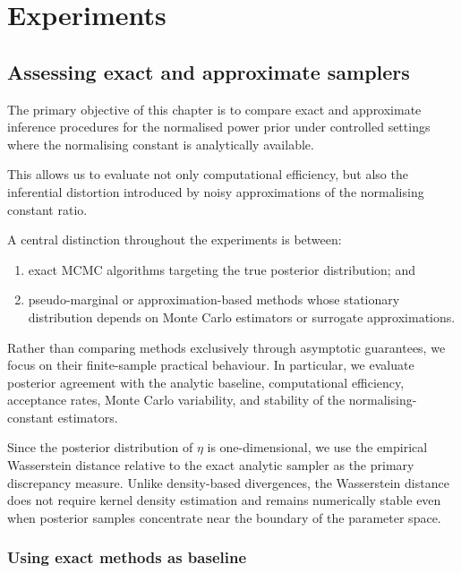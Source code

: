\chapter{Experiments}



\section{Assessing exact and approximate samplers}

The primary objective of this chapter is to compare exact and approximate inference procedures for the normalised power prior under controlled settings where the normalising constant is analytically available.

This allows us to evaluate not only computational efficiency, but also the inferential distortion introduced by noisy approximations of the normalising constant ratio.

A central distinction throughout the experiments is between:

\begin{enumerate}[label=(\roman*)]
    \item  exact MCMC algorithms targeting the true posterior distribution; and
    \item pseudo-marginal or approximation-based methods whose stationary distribution depends on Monte Carlo estimators or surrogate approximations.
\end{enumerate}

Rather than comparing methods exclusively through asymptotic guarantees, we focus on their finite-sample practical behaviour.
In particular, we evaluate posterior agreement with the analytic baseline, computational efficiency, acceptance rates, Monte Carlo variability, and stability of the normalising-constant estimators.

Since the posterior distribution of $\eta$ is one-dimensional, we use the empirical Wasserstein distance relative to the exact analytic sampler as the primary discrepancy measure.
Unlike density-based divergences, the Wasserstein distance does not require kernel density estimation and remains numerically stable even when posterior samples concentrate near the boundary of the parameter space.

\subsection{Using exact methods as baseline}

